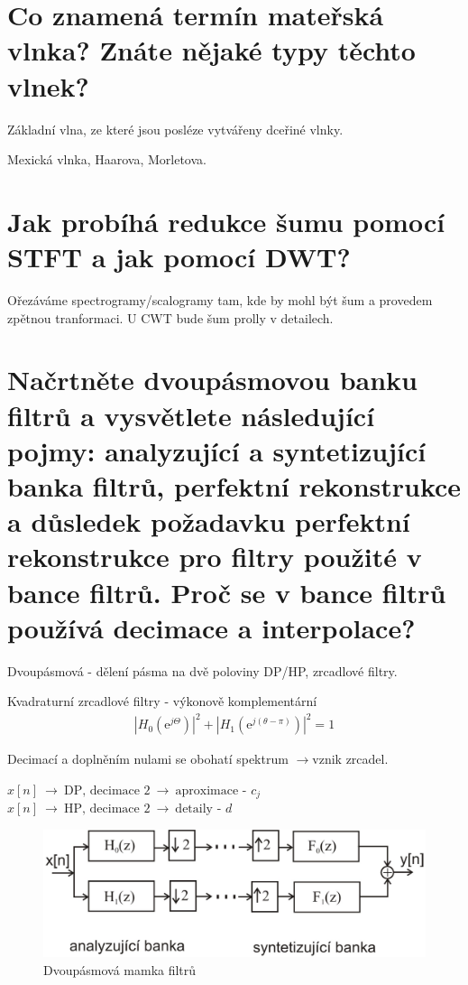 \documentclass[a4paper,12pt]{article}   %
\newcommand{\rrarr}{$\rightarrow$}
\newcommand{\ejt}{\text{e}^{j\Theta}}
\newcommand{\e}{\text{e}}
\begin{document}
\section{Co znamená termín mateřská vlnka? Znáte nějaké typy těchto vlnek?}

Základní vlna, ze které jsou posléze vytvářeny dceřiné vlnky. 

Mexická vlnka, Haarova, Morletova.


\section{Jak probíhá redukce šumu pomocí STFT a jak pomocí DWT?}

Ořezáváme spectrogramy/scalogramy tam, kde by mohl být šum a provedem zpětnou tranformaci. U CWT bude šum prolly v detailech. 


\section{Načrtněte dvoupásmovou banku filtrů a vysvětlete následující pojmy: analyzující a syntetizující banka filtrů, perfektní rekonstrukce a důsledek požadavku perfektní rekonstrukce pro filtry použité v bance filtrů. Proč se v bance filtrů používá decimace a interpolace?}
Dvoupásmová - dělení pásma na dvě poloviny DP/HP, zrcadlové filtry. 

Kvadraturní zrcadlové filtry - výkonově komplementární \
\begin{align*}
        |H_0(\ejt)|^2 + |H_1(\e^{j(\theta-\pi)})|^2 = 1
\end{align*}

Decimací a doplněním nulami se obohatí spektrum \rrarr vznik zrcadel.


$x[n]~\rightarrow~\text{DP, decimace 2}~\rightarrow~\text{aproximace - }c_j$\\
$x[n]~\rightarrow~\text{HP, decimace 2}~\rightarrow~\text{detaily - }d$

\begin{figure}[h!]
        \centering
        \includegraphics[width=.7\textwidth]{fig/banka_filtru.png}
        \caption*{Dvoupásmová mamka filtrů}
\end{figure}
\end{document}
